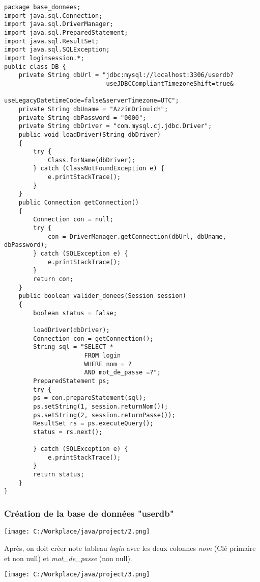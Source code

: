 \documentclass[12]{article}
\begin{document}
\begin{scriptsize}
\lstset{language=java}
\begin{lstlisting}
package base_donnees;
import java.sql.Connection;
import java.sql.DriverManager;
import java.sql.PreparedStatement;
import java.sql.ResultSet;
import java.sql.SQLException;
import loginsession.*;
public class DB {
	private String dbUrl = "jdbc:mysql://localhost:3306/userdb?
                            useJDBCCompliantTimezoneShift=true&
                            useLegacyDatetimeCode=false&serverTimezone=UTC";
	private String dbUname = "AzzimDriouich";
	private String dbPassword = "0000";
	private String dbDriver = "com.mysql.cj.jdbc.Driver";
	public void loadDriver(String dbDriver)
	{
		try {
			Class.forName(dbDriver);
		} catch (ClassNotFoundException e) {
			e.printStackTrace();
		}
	}
	public Connection getConnection()
	{
		Connection con = null;
		try {
			con = DriverManager.getConnection(dbUrl, dbUname, dbPassword);
		} catch (SQLException e) {
			e.printStackTrace();
		}
		return con;
	}
	public boolean valider_donees(Session session)
	{
		boolean status = false;

		loadDriver(dbDriver);
		Connection con = getConnection();
		String sql = "SELECT * 
					  FROM login 
					  WHERE nom = ? 
					  AND mot_de_passe =?";
		PreparedStatement ps;
		try {
		ps = con.prepareStatement(sql);
		ps.setString(1, session.returnNom());
		ps.setString(2, session.returnPasse());
		ResultSet rs = ps.executeQuery();
		status = rs.next();
		
		} catch (SQLException e) {
			e.printStackTrace();
		}
		return status;
	}
}
\end{lstlisting}
\end{scriptsize}


\subsubsection{Création de la base de données "userdb"}


\begin{center}
\texttt{[image: C:/Workplace/java/project/2.png]}
\end{center}

Après, on doit créer note tableau \textit{login} avec les deux colonnes \textit{nom} (Clé primaire et non null) et \textit{mot\_de\_passe} (non null).\\

\begin{center}
\texttt{[image: C:/Workplace/java/project/3.png]}
\end{center}
\end{document}
